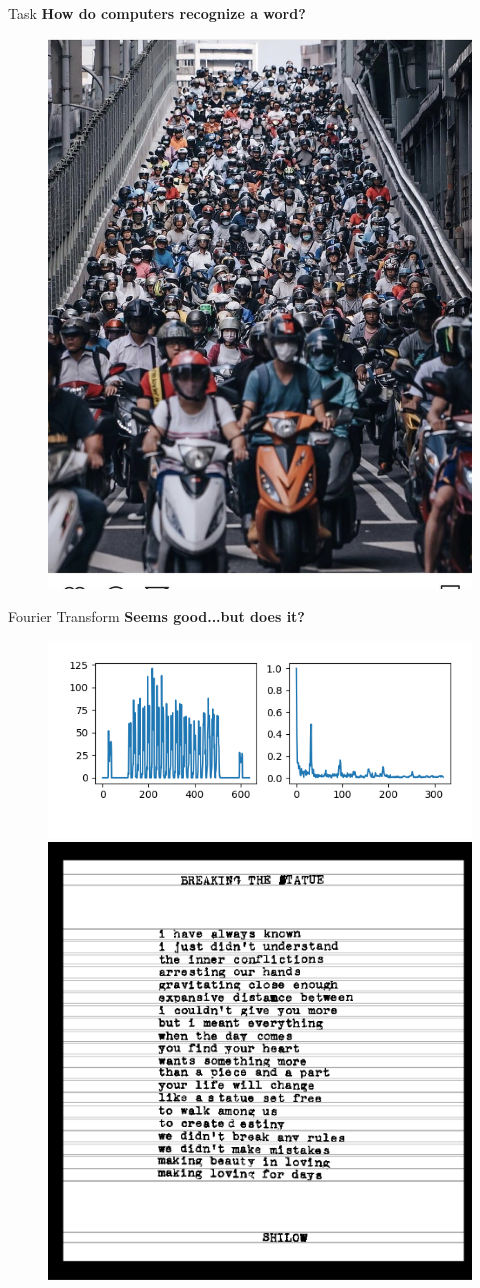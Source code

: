 \documentclass{beamer}
\begin{document}
\begin{frame}{Task}
		\textbf{How do computers recognize a word?}
		\begin{figure}[h]
			\centering
			\includegraphics[width=0.55\linewidth]{./motor.jpg}
		\end{figure}
\end{frame}

\begin{frame}{Fourier Transform}
	\textbf{Seems good...but does it?}
		\begin{figure}[H]
			\includegraphics[width=0.45\linewidth]{./fourier.png}
			\includegraphics[width=0.55\linewidth]{./imgslice.png}
		\end{figure}
\end{frame}
\end{document}
